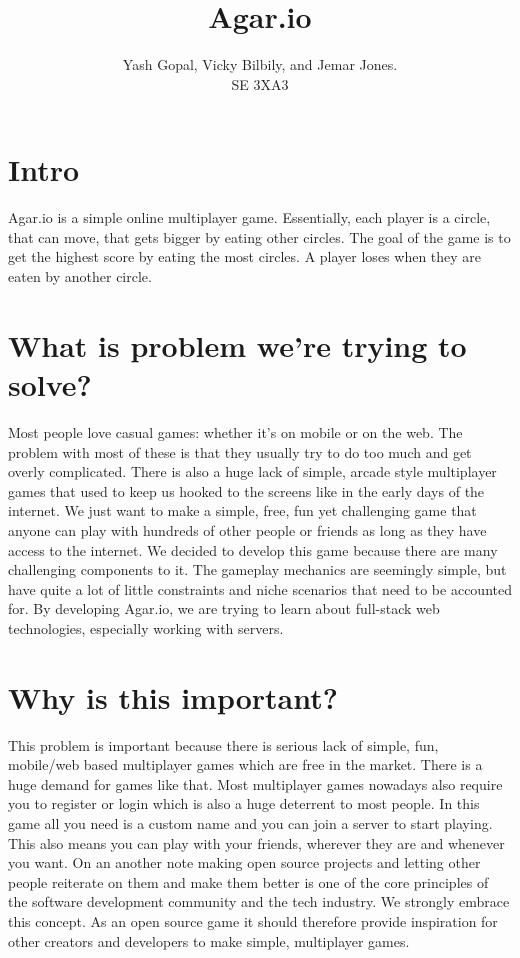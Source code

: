 \documentclass{article}
\begin{document}
\title{Agar.io}
\author{Yash Gopal, Vicky Bilbily, and Jemar Jones.\\
  SE 3XA3\\}
\date{}
\maketitle


\section*{Intro}
Agar.io is a simple online multiplayer game. Essentially, each player is a circle, that can move, that gets bigger by eating other circles. The goal of the game is to get the highest score by eating the most circles. A player loses when they are eaten by another circle. 
\section*{What is problem we're trying to solve?}
Most people love casual games: whether it's on mobile or on the web. The problem with most of these is that they usually try to do too much and get overly complicated. There is also a huge lack of simple, arcade style multiplayer games that used to keep us hooked to the screens like in the early days of the internet. We just want to make a simple, free, fun yet challenging game that anyone can play with hundreds of other people or friends as long as they have access to the internet. 
We decided to develop this game because there are many challenging components to it. The gameplay mechanics are seemingly simple, but have quite a lot of little constraints and niche scenarios that need to be accounted for.  By developing Agar.io, we are trying to learn about full-stack web technologies, especially working with servers. 
\section*{Why is this important?}
This problem is important because there is serious lack of simple, fun, mobile/web based multiplayer games which are free in the market. There is a huge demand for games like that. Most multiplayer games nowadays also require you to register or login which is also a huge deterrent to most people. In this game all you need is a custom name and you can join a server to start playing. This also means you can play with your friends, wherever they are and whenever you want.  
On an another note making open source projects and letting other people reiterate on them and make them better is one of the core principles of the software development community and the tech industry. We strongly embrace this concept. As an open source game it should therefore provide inspiration for other creators and developers to make simple, multiplayer games. 
\end{document}
